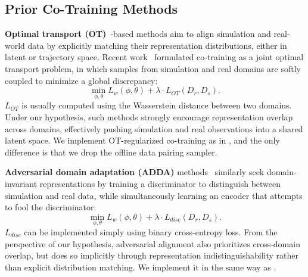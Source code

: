 \subsection{Prior Co-Training Methods}

\textbf{Optimal transport (OT)}~\cite{courty2016optimal}-based methods aim to align simulation and real-world data by explicitly matching their representation distributions, either in latent or trajectory space.
Recent work~\cite{punamiya2025egobridge, cheng2025generalizable} formulated co-training as a joint optimal transport problem, in which samples from simulation and real domains are softly coupled to minimize a global discrepancy:
\begin{equation}
    \min_{\phi,\theta} L_w(\phi, \theta) + \lambda\cdot L_{OT}(D_r, D_s).
\end{equation}
$L_{OT}$ is usually computed using the Wasserstein distance between two domains. Under our hypothesis, such methods strongly encourage representation overlap across domains, effectively pushing simulation and real observations into a shared latent space.
We implement OT-regularized co-training as in \citet{cheng2025generalizable}, and the only difference is that we drop the offline data pairing sampler.

\textbf{Adversarial domain adaptation (ADDA)} methods~\cite{tzeng2017adversarial, cai2025n} similarly seek domain-invariant representations by training a discriminator to distinguish between simulation and real data, while simultaneously learning an encoder that attempts to fool the discriminator:
\begin{equation}
    \min_{\phi,\theta} L_w(\phi, \theta) + \lambda\cdot L_{disc}(D_r, D_s).
\end{equation}
$L_{disc}$ can be implemented simply using binary cross-entropy loss.
From the perspective of our hypothesis, adversarial alignment also prioritizes cross-domain overlap, but does so implicitly through representation indistinguishability rather than explicit distribution matching.
We implement it in the same way as \citet{tzeng2017adversarial}.


